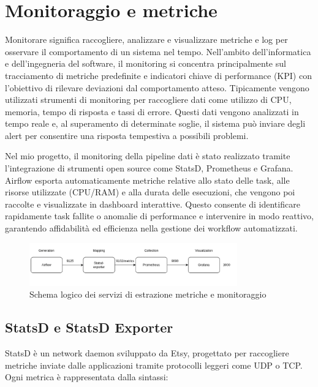 \section{Monitoraggio e metriche}
\label{sec:monitoraggioemetriche}

Monitorare significa raccogliere, analizzare e visualizzare metriche e log per osservare il comportamento di un sistema nel tempo. Nell’ambito dell’informatica e dell’ingegneria del software, il monitoring si concentra principalmente sul tracciamento di metriche predefinite e indicatori chiave di performance (KPI) con l’obiettivo di rilevare deviazioni dal comportamento atteso.
Tipicamente vengono utilizzati strumenti di monitoring per raccogliere dati come utilizzo di CPU, memoria, tempo di risposta e tassi di errore. Questi dati vengono analizzati in tempo reale e, al superamento di determinate soglie, il sistema può inviare degli alert per consentire una risposta tempestiva a possibili problemi.

Nel mio progetto, il monitoring della pipeline dati è stato realizzato tramite l’integrazione di strumenti open source come StatsD, Prometheus e Grafana. Airflow esporta automaticamente metriche relative allo stato delle task, alle risorse utilizzate (CPU/RAM) e alla durata delle esecuzioni, che vengono poi raccolte e visualizzate in dashboard interattive. Questo consente di identificare rapidamente task fallite o anomalie di performance e intervenire in modo reattivo, garantendo affidabilità ed efficienza nella gestione dei workflow automatizzati.

\begin{figure}[h]
    \centering
    \includegraphics[width=0.8\textwidth]{img/monitoraggioschema.png}
    \caption{Schema logico dei servizi di estrazione metriche e monitoraggio}
    \label{fig:monitoring_schema}
\end{figure}

\subsection{StatsD e StatsD Exporter}
\label{sec:statsd}

StatsD è un network daemon sviluppato da Etsy, progettato per raccogliere metriche inviate dalle applicazioni tramite protocolli leggeri come UDP o TCP. Ogni metrica è rappresentata dalla sintassi:

